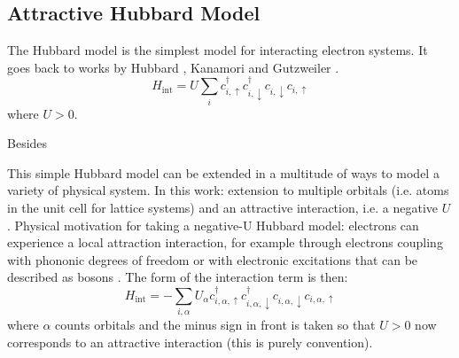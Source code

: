 \documentclass[../notes.tex]{subfiles}
\begin{document}


\subsection{Attractive Hubbard Model}\label{ssec:attractive hubbard model}

The Hubbard model is the simplest model for interacting electron systems.
It goes back to works by Hubbard \cite{hubbardElectronCorrelationsNarrow1963}, Kanamori \cite{kanamoriElectronCorrelationFerromagnetism1963} and Gutzweiler \cite{gutzwillerEffectCorrelationFerromagnetism1963}.
\begin{equation}
	H_{\mathrm{int}} = U \sum_{i} c_{i, \uparrow}^{\dagger} c_{i, \downarrow}^{\dagger} c_{i, \downarrow} c_{i, \uparrow}
\end{equation}
where \(U > 0\).

Besides 

\cite{qinHubbardModelComputational2022}


This simple Hubbard model can be extended in a multitude of ways to model a variety of physical system.
In this work: extension to multiple orbitals (i.e. atoms in the unit cell for lattice systems) and an attractive interaction, i.e. a negative \(U\).
Physical motivation for taking a negative-U Hubbard model: electrons can experience a local attraction interaction, for example through electrons coupling with phononic degrees of freedom or with electronic excitations that can be described as bosons \cite{micnasSuperconductivityNarrowbandSystems1990}.
The form of the interaction term is then: 
\begin{equation}
	H_{\mathrm{int}} = -\sum_{i, \alpha} U_{\alpha} c_{i, \alpha, \uparrow}^{\dagger} c_{i, \alpha, \downarrow}^{\dagger} c_{i, \alpha, \downarrow} c_{i, \alpha, \uparrow}
	\label{eq:Hubbard interaction multiband}
\end{equation}
where \(\alpha\) counts orbitals and the minus sign in front is taken so that \(U > 0\) now corresponds to an attractive interaction (this is purely convention).
\end{document}
